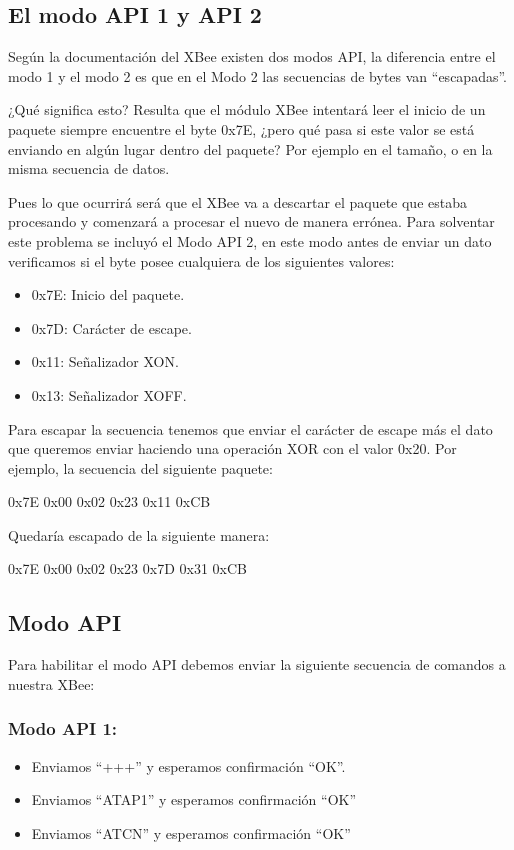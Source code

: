 \documentclass[11pt,oneside,spanish,a4paper]{article}
\begin{document}
\subsection{El modo API 1 y API 2}
Según la documentación del XBee existen dos modos API, la diferencia entre el modo 1 y el modo 2 es que en el Modo 2 las secuencias de bytes van ``escapadas''.

¿Qué significa esto? Resulta que el módulo XBee intentará leer el inicio de un paquete siempre encuentre el byte 0x7E, ¿pero qué pasa si este valor se está enviando en algún lugar dentro del paquete? Por ejemplo en el tamaño, o en la misma secuencia de datos.

Pues lo que ocurrirá será que el XBee va a descartar el paquete que estaba procesando y comenzará a procesar el nuevo de manera errónea. Para solventar este problema se incluyó el Modo API 2, en este modo antes de enviar un dato verificamos si el byte posee cualquiera de los siguientes valores:
\begin{itemize}
	\item 0x7E: Inicio del paquete.
	\item 0x7D: Carácter de escape.
	\item 0x11: Señalizador XON.
	\item 0x13: Señalizador XOFF.	
\end{itemize}
Para escapar la secuencia tenemos que enviar el carácter de escape más el dato que queremos enviar haciendo una operación XOR con el valor 0x20.
Por ejemplo, la secuencia del siguiente paquete:

0x7E 0x00 0x02 0x23 0x11 0xCB

Quedaría escapado de la siguiente manera:

0x7E 0x00 0x02 0x23 0x7D 0x31 0xCB

\subsection{Modo API}
Para habilitar el modo API debemos enviar la siguiente secuencia de comandos a nuestra XBee:
\subsubsection{Modo API 1:}
\begin{itemize}
	\item Enviamos ``+++'' y esperamos confirmaci\'on ``OK''.
	\item Enviamos ``ATAP1'' y esperamos confirmaci\'on ``OK''
	\item Enviamos ``ATCN'' y esperamos confirmaci\'on ``OK''
\end{itemize}
\end{document}
